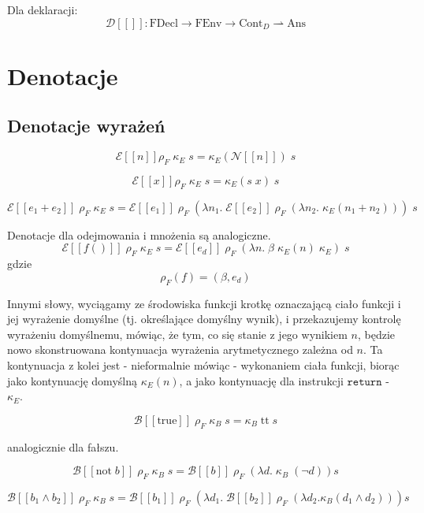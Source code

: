 \documentclass[a4paper]{article}
\begin{document}
Dla deklaracji:
$$
\mathcal{D}[\![]\!]: \text{FDecl} \longrightarrow \text{FEnv} \longrightarrow \text{Cont}_D \rightharpoonup \text{Ans}
$$


\section*{Denotacje}

\subsection*{Denotacje wyrażeń}

$$
\mathcal{E}[\![n]\!] \rho_F \; \kappa_E \; s = \kappa_E(\mathcal{N}[\![n]\!]) \; s
$$

$$
\mathcal{E}[\![ x ]\!] \rho_F \; \kappa_E \; s = \kappa_E(s \; x) \; s
$$

$$
\mathcal{E}[\![e_1 + e_2]\!] \; \rho_F \; \kappa_E \; s = \mathcal{E}[\![e_1]\!] \; \rho_F \; (\lambda n_1. \;
\mathcal{E}[\![e_2]\!] \; \rho_F \; (\lambda n_2. \;
\kappa_E (n_1+n_2))) \; s
$$

Denotacje dla odejmowania i mnożenia są analogiczne. \\

$$
\mathcal{E}[\![ f() ]\!] \; \rho_F \; \kappa_E \; s = \mathcal{E}[\![ e_d ]\!] \; \rho_F \; (\lambda n. \; \beta \; \kappa_E(n) \; \kappa_E)\;  s
$$
gdzie
$$
\rho_F(f) = (\beta, e_d)
$$

Innymi słowy, wyciągamy ze środowiska funkcji krotkę oznaczającą ciało funkcji i jej wyrażenie domyślne (tj. określające domyślny wynik), i przekazujemy kontrolę wyrażeniu domyślnemu, mówiąc, że tym, co się stanie z jego wynikiem $n$, będzie nowo skonstruowana kontynuacja wyrażenia arytmetycznego zależna od $n$. Ta kontynuacja z kolei jest - nieformalnie mówiąc - wykonaniem ciała funkcji, biorąc jako kontynuację domyślną $\kappa_E(n)$, a jako kontynuację dla instrukcji $\texttt{return}$ - $\kappa_E$.


$$
\mathcal{B}[\![ \text{true} ]\!] \; \rho_F \; \kappa_B \; s = \kappa_B \; \text{tt} \; s
$$

analogicznie dla fałszu.

$$
\mathcal{B}[\![ \text{not} \; b]\!] \; \rho_F \; \kappa_B \; s = \mathcal{B}[\![b]\!] \; \rho_F \; (\lambda d. \; \kappa_B \; (\lnot d) ) s
$$

$$
\mathcal{B}[\![b_1 \land b_2]\!] \; \rho_F \; \kappa_B \; s = \mathcal{B}[\![b_1 ]\!] \; \rho_F \; (\lambda d_1. \; \mathcal{B}[\![b_2]\!] \; \rho_F \; (\lambda d_2. \kappa_B(d_1 \land d_2))) s
$$
\end{document}
